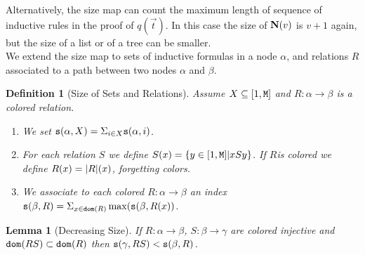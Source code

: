\documentclass{lmcs}
\newtheorem{lemma}[theorem]{Lemma}
\newtheorem{definition}[theorem]{Definition}
\begin{document}
Alternatively, the size map can count the maximum length of sequence of 
inductive rules in the proof of $q(\vec{t})$. In this case the size of ${\bf N}(v)$ is $v+1$ again,
but the size of a list or of a tree can be smaller.
\\

% 
 

We extend the size map to sets of inductive formulas in a node $\alpha$,
and relations $R$ associated to a path between two nodes $\alpha$ and $\beta$.
 
 
\begin{definition}[Size of Sets and Relations]
Assume $X \subseteq [1,{\tt M}]$ and $R:\alpha \rightarrow \beta$  is a colored
relation.
\begin{enumerate} 
\item
We set ${\tt s}(\alpha, X) = \Sigma_{i \in X} {\tt s}(\alpha,i)$.
\item
For each relation $S$ we define $S(x) = \{y \in [1,{\tt M}] | x S y \}$. 
If $R$is colored we define $R(x) = {| R |}(x)$, forgetting colors.
\item
We associate to each colored $R:\alpha \rightarrow \beta$ 
an index ${\tt s}(\beta, R) =
\Sigma_{x \in {\tt dom}(R)} \max({\tt s}(\beta, R(x))$.
\end{enumerate}
\end{definition}

\begin{lemma}[Decreasing Size]
\label{lemma-decreasing-size}
If $R:\alpha \rightarrow \beta$, $S:\beta \rightarrow \gamma$ 
are colored injective and ${\tt dom}(RS) \subset {\tt dom}(R)$ then
${\tt s}(\gamma, RS) < {\tt s}(\beta, R)$.
\end{lemma}
\end{document}
